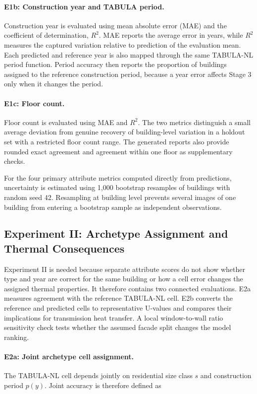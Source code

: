\paragraph{E1b: Construction year and TABULA period.}
Construction year is evaluated using mean absolute error (MAE) and the coefficient of determination, $R^2$. MAE reports the average error in years, while $R^2$ measures the captured variation relative to prediction of the evaluation mean. Each predicted and reference year is also mapped through the same TABULA-NL period function. Period accuracy then reports the proportion of buildings assigned to the reference construction period, because a year error affects Stage 3 only when it changes the period.

\paragraph{E1c: Floor count.}
Floor count is evaluated using MAE and $R^2$. The two metrics distinguish a small average deviation from genuine recovery of building-level variation in a holdout set with a restricted floor count range. The generated reports also provide rounded exact agreement and agreement within one floor as supplementary checks.

For the four primary attribute metrics computed directly from predictions, uncertainty is estimated using 1,000 bootstrap resamples of buildings with random seed 42. Resampling at building level prevents several images of one building from entering a bootstrap sample as independent observations.

\subsection{Experiment II: Archetype Assignment and Thermal Consequences}
\label{sec:weighted_archetype_metric}

Experiment II is needed because separate attribute scores do not show whether type and year are correct for the same building or how a cell error changes the assigned thermal properties. It therefore contains two connected evaluations. E2a measures agreement with the reference TABULA-NL cell. E2b converts the reference and predicted cells to representative U-values and compares their implications for transmission heat transfer. A local window-to-wall ratio sensitivity check tests whether the assumed facade split changes the model ranking.

\paragraph{E2a: Joint archetype cell assignment.}
The TABULA-NL cell depends jointly on residential size class $s$ and construction period $p(y)$. Joint accuracy is therefore defined as

